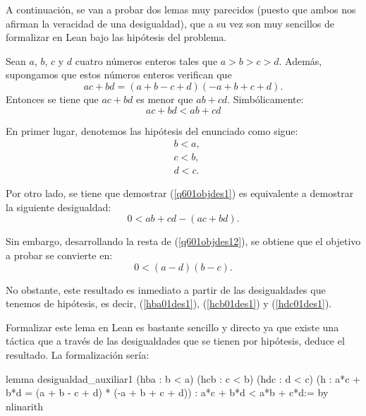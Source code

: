 A continuación, se van a probar dos lemas muy parecidos (puesto que ambos nos
afirman la veracidad de una desigualdad), que a su vez son muy sencillos de
formalizar en Lean bajo las hipótesis del problema.

\begin{lema}\label{lemades1}
  Sean \(a\), \(b\), \(c\) y \(d\) cuatro números enteros tales que
  \(a > b > c > d \). Además, supongamos que
  estos números enteros verifican que
    \begin{equation}\tag{h}
      ac+bd = (a+b-c+d)(-a+b+c+d).
    \end{equation}
    Entonces se tiene que \(ac+bd\) es menor que \(ab+cd\). Simbólicamente:
    \begin{equation}\label{q601objdes1}
      ac+bd<ab+cd
    \end{equation}
\end{lema}

\begin{demostracion}
    En primer lugar, denotemos las hipótesis del enunciado como sigue:
  \begin{align}
    &b<a,\tag{hba}\label{hba01des1}\\
    &c<b,\tag{hcb}\label{hcb01des1}\\
    &d<c.\tag{hdc}\label{hdc01des1}
  \end{align}

  Por otro lado, se tiene que demostrar (\ref{q601objdes1}) es equivalente
  a demostrar la siguiente desigualdad:
  \begin{equation}\label{q601objdes12}
      0<ab+cd-(ac+bd).
  \end{equation}

  Sin embargo, desarrollando la resta de (\ref{q601objdes12}), se obtiene
  que el objetivo a probar se convierte en:
  \begin{equation}\label{q601objdes13}
      0<(a-d)(b-c).
  \end{equation}

  No obstante, este resultado es inmediato a partir de las desigualdades
  que tenemos de hipótesis, es decir, (\ref{hba01des1}), (\ref{hcb01des1})
  y (\ref{hdc01des1}).
\end{demostracion}

Formalizar este lema en Lean es bastante sencillo y directo ya que existe
una táctica que a través de las desigualdades que se tienen por hipótesis,
deduce el resultado. La formalización sería:
\begin{leancode}
lemma desigualdad_auxiliar1
  (hba : b < a)
  (hcb : c < b)
  (hdc : d < c)
  (h : a*c + b*d = (a + b - c + d) * (-a + b + c + d))
  : a*c + b*d < a*b + c*d:=
by nlinarith
\end{leancode}

